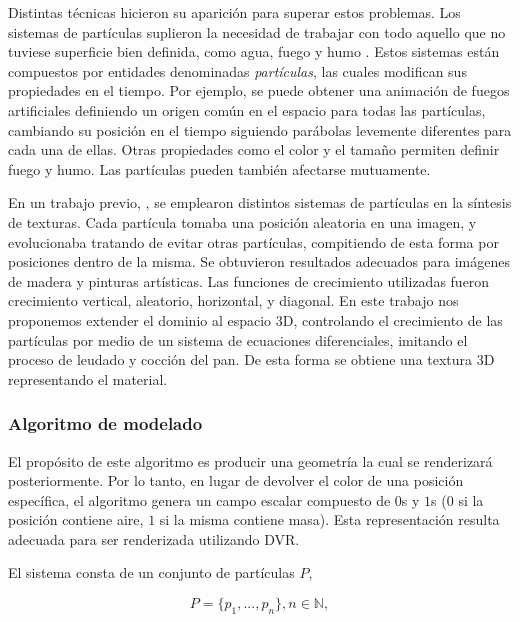\documentclass[oneside,a4paper,spanish,links]{amca}
\begin{document}
Distintas t\'ecnicas hicieron su aparici\'on para superar estos problemas. Los sistemas de part\'iculas \citep{Reeves83} suplieron la necesidad de trabajar con todo aquello que no tuviese superficie bien definida, como agua, fuego y humo \citep{Cords2008, Paiva2009,Muller2003}. Estos sistemas est\'an compuestos por entidades denominadas {\em part\'iculas}, las cuales modifican sus propiedades en el tiempo. Por ejemplo, se puede obtener una animaci\'on de fuegos artificiales definiendo un origen com\'un en el espacio para todas las part\'iculas, cambiando su posici\'on en el tiempo siguiendo par\'abolas levemente diferentes para cada una de ellas. Otras propiedades como el color y el tama\~no permiten definir fuego y humo. Las part\'iculas pueden tambi\'en afectarse mutuamente.

En un trabajo previo, \citep{Baravalle2011}, se emplearon distintos sistemas de part\'iculas en la s\'intesis de texturas. Cada part\'icula tomaba una posici\'on aleatoria en una imagen, y evolucionaba tratando de evitar otras part\'iculas, compitiendo de esta forma por posiciones dentro de la misma. Se obtuvieron resultados adecuados para im\'agenes de madera y pinturas art\'isticas. Las funciones de crecimiento utilizadas fueron crecimiento vertical, aleatorio, horizontal, y diagonal. En este trabajo nos proponemos extender el dominio al espacio 3D, controlando el crecimiento de las part\'iculas por medio de un sistema de ecuaciones diferenciales, imitando el proceso de leudado y cocci\'on del pan. De esta forma se obtiene una textura 3D representando el material.


\subsubsection{Algoritmo de modelado}

El prop\'osito de este algoritmo es producir una geometr\'ia la cual se renderizar\'a posteriormente. Por lo tanto, en lugar de devolver el color de una posici\'on espec\'ifica, el algoritmo genera un campo escalar compuesto de $0$s y $1$s ($0$ si la posici\'on contiene aire, $1$ si la misma contiene masa). Esta representaci\'on resulta adecuada para ser renderizada utilizando DVR.

El sistema consta de un conjunto de part\'iculas $P$,

\begin{equation}
  P = \{p_{1}, ... , p_{n}\}, n  \in \mathbb{N},
\end{equation}
\end{document}
